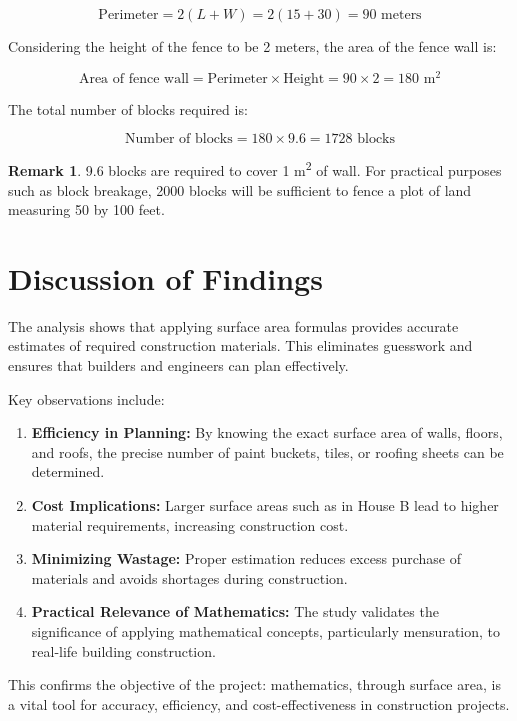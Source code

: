 \documentclass[12pt,a4paper,openany,titlepage,reqno, final]{report}
\theoremstyle{definition}
\newtheorem{rem}[dfn]{Remark}
\begin{document}
	 \[
	 \text{Perimeter} = 2(L + W) = 2(15 + 30) = 90 \text{ meters}
	 \]
	 
	 \noindent Considering the height of the fence to be 2 meters, the area of the fence wall is:
	 
	 \[
	 \text{Area of fence wall} = \text{Perimeter} \times \text{Height} = 90 \times 2 = 180 \text{ m}^2
	 \]
	 
	 \noindent The total number of blocks required is:
	 
	 \[
	 \text{Number of blocks} = 180 \times 9.6 = 1728 \text{ blocks}
	 \]
	 
\begin{rem}
	9.6 blocks are required to cover 1 m\textsuperscript{2} of wall. For practical purposes such as block breakage, 2000 blocks will be sufficient to fence a plot of land measuring 50 by 100 feet.
\end{rem}	 	
	 \noindent 	\section{Discussion of Findings}
	 The analysis shows that applying surface area formulas provides accurate estimates of required construction materials. This eliminates guesswork and ensures that builders and engineers can plan effectively.
	 
	 Key observations include:
	 \begin{enumerate}
	 	\item \textbf{Efficiency in Planning:} By knowing the exact surface area of walls, floors, and roofs, the precise number of paint buckets, tiles, or roofing sheets can be determined.
	 	\item \textbf{Cost Implications:} Larger surface areas such as in House B lead to higher material requirements, increasing construction cost.
	 	\item \textbf{Minimizing Wastage:} Proper estimation reduces excess purchase of materials and avoids shortages during construction.
	 	\item \textbf{Practical Relevance of Mathematics:} The study validates the significance of applying mathematical concepts, particularly mensuration, to real-life building construction.
	 \end{enumerate}
	 \noindent This confirms the objective of the project: mathematics, through surface area, is a vital tool for accuracy, efficiency, and cost-effectiveness in construction projects.
\end{document}
